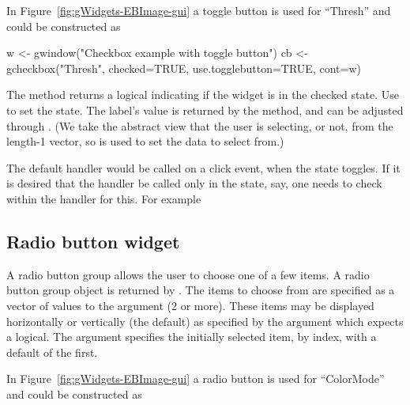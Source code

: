 In Figure~\ref{fig:gWidgets-EBImage-gui} a toggle button is used for
``Thresh''  and could be constructed as

\begin{Schunk}
\begin{Sinput}
 w <- gwindow("Checkbox example with toggle button")
 cb <- gcheckbox("Thresh", checked=TRUE, use.togglebutton=TRUE,
                 cont=w)
\end{Sinput}
\end{Schunk}

The  method returns a logical indicating if
the widget is in the checked state. Use  to set
the state. The label's value is returned by the
\method{[}{gcheckbox} method, and can be adjusted through 
\method{[\ASSIGN}{gcheckbox}. (We take the abstract view that the user
is selecting, or not, from the length-1 vector, so \meth{[} is used to
set the data to select from.)

The default handler would be called on a click event, when the state toggles. If it is desired
that the handler be called only in the  state, say, one
needs to check within the handler for this. For example
\begin{Schunk}
\end{Schunk}

\subsection{Radio button widget}
\label{sec:gWidgets-radio-button-widget}

A radio button group allows the user to choose one of a few
items. A radio button group object is returned by
. The items to choose from are specified as a
vector of values to the  argument (2 or more). These items
may be displayed horizontally or vertically (the default) as specified by the
 argument which expects a logical. The
 argument specifies the initially selected
item, by index,
with a default of the first.


In Figure~\ref{fig:gWidgets-EBImage-gui} a radio button is used for
``ColorMode''  and could be constructed as

